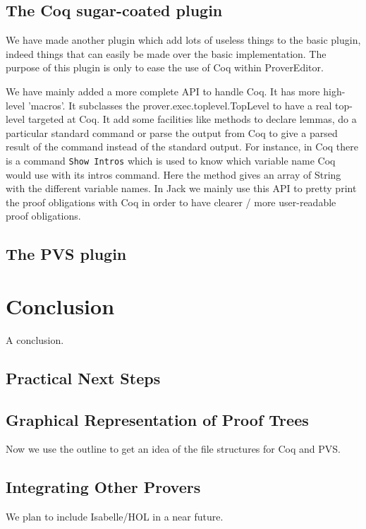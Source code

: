 \documentclass{entcs}
\begin{document}
\subsection{The Coq sugar-coated plugin}
We have made another plugin which add lots of useless things to the basic plugin,
indeed things that can easily be made over the basic implementation.
The purpose of this plugin is only to ease the use of Coq within ProverEditor.

We have mainly added a more complete API to handle Coq. It has more high-level
'macros'. It subclasses the prover.exec.toplevel.TopLevel to have a real top-level
targeted at Coq. It add some facilities like methods to declare lemmas, do a particular
standard command or parse the output from Coq to give a parsed result of the command
instead of the standard output. For instance, in Coq there is a command {\tt Show Intros} which
is used to know which variable name Coq would use with its  intros command. Here the
method gives an array of String with the different variable names.
In Jack we mainly use this API to pretty print the proof obligations with Coq in order
to have clearer / more user-readable proof obligations.

\subsection{The PVS plugin}
\section{Conclusion}

A conclusion.

\subsection{Practical Next Steps}

\subsection{Graphical Representation of Proof Trees}
Now we use the outline to get an idea of the file structures for Coq and PVS.

\subsection{Integrating Other Provers}
We plan to include Isabelle/HOL in a near future.
\end{document}
